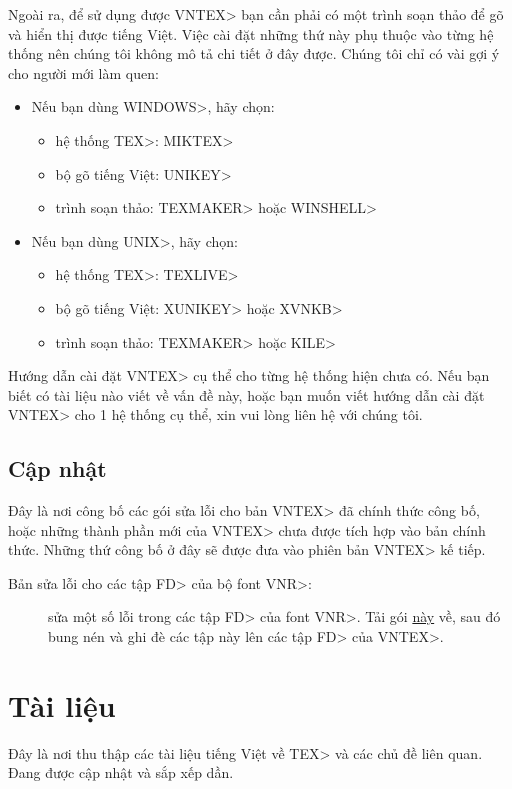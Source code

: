 \documentclass[12pt,a4paper]{article}
\begin{document}
Ngoài ra, để sử dụng được \<VNTEX> bạn cần phải có một trình soạn thảo để
gõ và hiển thị được tiếng Việt. Việc cài đặt những thứ này phụ thuộc vào
từng hệ thống nên chúng tôi không mô tả chi tiết ở đây được. Chúng tôi chỉ
có vài gợi ý cho người mới làm quen:
\begin{itemize}
\item Nếu bạn dùng \<WINDOWS>, hãy chọn:
\begin{itemize}
\item hệ thống \<TEX>: \<MIKTEX>
\item bộ gõ tiếng Việt: \<UNIKEY>
\item trình soạn thảo: \<TEXMAKER> hoặc \<WINSHELL>
\end{itemize}

\item Nếu bạn dùng \<UNIX>, hãy chọn:
\begin{itemize}
\item hệ thống \<TEX>: \<TEXLIVE>
\item bộ gõ tiếng Việt: \<XUNIKEY>  hoặc \<XVNKB>
\item trình soạn thảo: \<TEXMAKER> hoặc \<KILE>
\end{itemize}
\end{itemize}

Hướng dẫn cài đặt \<VNTEX> cụ thể cho từng hệ thống hiện chưa có. Nếu bạn
biết có tài liệu nào viết về vấn đề này, hoặc bạn muốn viết hướng dẫn cài
đặt \<VNTEX> cho 1 hệ thống cụ thể, xin vui lòng liên hệ với chúng tôi.

\subsection{Cập nhật}
\hypertarget{cap-nhat}{}
Đây là nơi công bố các gói sửa lỗi cho bản \<VNTEX> đã chính thức công bố,
hoặc những thành phần mới của \<VNTEX> chưa được tích hợp vào bản chính
thức. Những thứ công bố ở đây sẽ được đưa vào phiên bản \<VNTEX> kế tiếp.

\begin{description}
\item[Bản sửa lỗi cho các tập \<FD> của bộ font \<VNR>:]
  \hypertarget{cap-nhat-vnr-fd}{} sửa một số lỗi trong các tập \<FD>
  của font \<VNR>. Tải gói
  \href{http://vntex.org/download/vntex-updates/vntex-update-20060603.zip}{này}
  về, sau đó bung nén và ghi đè các tập này lên các tập \<FD> của
  \<VNTEX>.
\end{description}


\section{Tài liệu}
\hypertarget{tai-lieu}{}
Đây là nơi thu thập các tài liệu tiếng Việt về \<TEX> và các  chủ đề liên
quan. Đang được cập nhật và sắp xếp dần.
\end{document}
